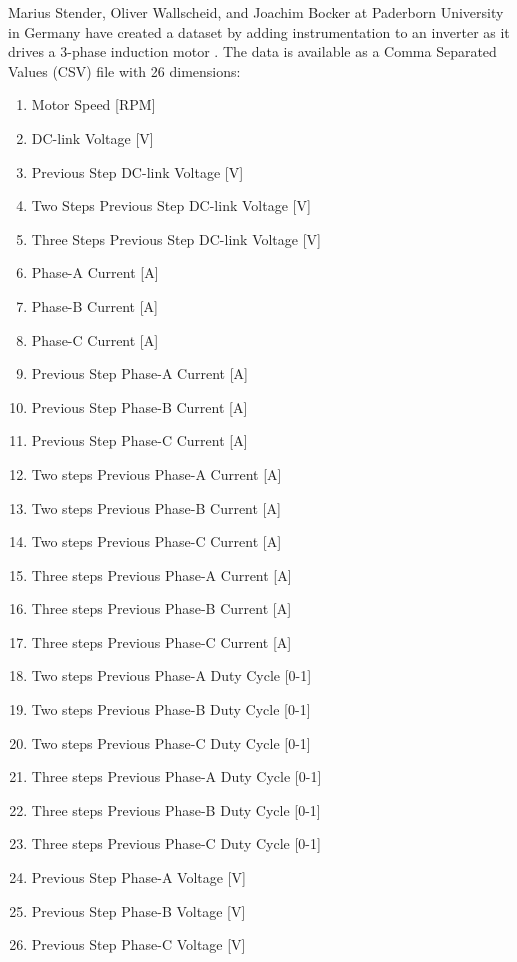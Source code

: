 \documentclass[11pt,letterpaper]{article}
\begin{document}
Marius Stender, Oliver Wallscheid, and Joachim Bocker at Paderborn University in Germany have created a dataset by adding instrumentation to an inverter as it drives a 3-phase induction motor \cite{Stender2020-qi}\cite{Stender_undated-rx}. The data is available as a Comma Separated Values (CSV) file with 26 dimensions:
\begin{enumerate}
	\item Motor Speed [RPM]
	\item DC-link Voltage [V]
	\item Previous Step DC-link Voltage [V]
	\item Two Steps Previous Step DC-link Voltage [V]
	\item Three Steps Previous Step DC-link Voltage [V]
	\item Phase-A Current [A]
	\item Phase-B Current [A]
	\item Phase-C Current [A]
	\item Previous Step Phase-A Current [A]
	\item Previous Step Phase-B Current [A]
	\item Previous Step Phase-C Current [A]
	\item Two steps Previous Phase-A Current [A]
	\item Two steps Previous Phase-B Current [A]
	\item Two steps Previous Phase-C Current [A]
	\item Three steps Previous Phase-A Current [A]
	\item Three steps Previous Phase-B Current [A]
	\item Three steps Previous Phase-C Current [A]
	\item Two steps Previous Phase-A Duty Cycle [0-1]
	\item Two steps Previous Phase-B Duty Cycle [0-1]
	\item Two steps Previous Phase-C Duty Cycle [0-1]
	\item Three steps Previous Phase-A Duty Cycle [0-1]
	\item Three steps Previous Phase-B Duty Cycle [0-1]
	\item Three steps Previous Phase-C Duty Cycle [0-1]
	\item Previous Step Phase-A Voltage [V]
	\item Previous Step Phase-B Voltage [V]
	\item Previous Step Phase-C Voltage [V]
\end{enumerate}
\end{document}
